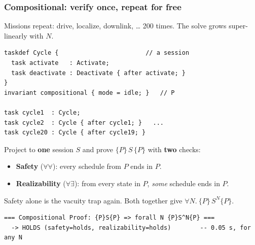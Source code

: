 \begin{frame}[fragile]
  \frametitle{Compositional: verify once, repeat for free} \small

Missions repeat: drive, localize, downlink, \dots{} 200 times. The solve grows super-linearly with $N$.

\begin{lstlisting}[basicstyle=\ttfamily\tiny]
taskdef Cycle {                        // a session
  task activate   : Activate;
  task deactivate : Deactivate { after activate; }
}
invariant compositional { mode = idle; }   // P

task cycle1  : Cycle;
task cycle2  : Cycle { after cycle1; }   ...
task cycle20 : Cycle { after cycle19; }
\end{lstlisting}

\pause
Project to {\bf one} session $S$ and prove $\{P\}\,S\,\{P\}$ with {\bf two} checks:

\begin{itemize}
\item {\bf Safety} ($\forall\forall$): every schedule from $P$ ends in $P$.
\item {\bf Realizability} ($\forall\exists$): from every state in $P$, {\em some} schedule ends in $P$.
\end{itemize}

Safety alone is the vacuity trap again. Both together give $\forall N.\ \{P\}\,S^N\{P\}$.

\begin{lstlisting}[style=shell,basicstyle=\ttfamily\tiny]
=== Compositional Proof: {P}S{P} => forall N {P}S^N{P} ===
  -> HOLDS (safety=holds, realizability=holds)        -- 0.05 s, for any N
\end{lstlisting}

\end{frame}

